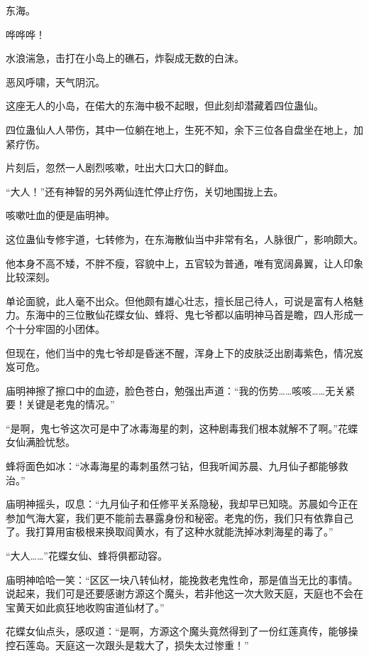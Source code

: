 
\begin{this_body}



东海。

哗哗哗！

水浪湍急，击打在小岛上的礁石，炸裂成无数的白沫。

恶风呼啸，天气阴沉。

这座无人的小岛，在偌大的东海中极不起眼，但此刻却潜藏着四位蛊仙。

四位蛊仙人人带伤，其中一位躺在地上，生死不知，余下三位各自盘坐在地上，加紧疗伤。

片刻后，忽然一人剧烈咳嗽，吐出大口大口的鲜血。

“大人！”还有神智的另外两仙连忙停止疗伤，关切地围拢上去。

咳嗽吐血的便是庙明神。

这位蛊仙专修宇道，七转修为，在东海散仙当中非常有名，人脉很广，影响颇大。

他本身不高不矮，不胖不瘦，容貌中上，五官较为普通，唯有宽阔鼻翼，让人印象比较深刻。

单论面貌，此人毫不出众。但他颇有雄心壮志，擅长屈己待人，可说是富有人格魅力。东海中的三位散仙花蝶女仙、蜂将、鬼七爷都以庙明神马首是瞻，四人形成一个十分牢固的小团体。

但现在，他们当中的鬼七爷却是昏迷不醒，浑身上下的皮肤泛出剧毒紫色，情况岌岌可危。

庙明神擦了擦口中的血迹，脸色苍白，勉强出声道：“我的伤势……咳咳……无关紧要！关键是老鬼的情况。”

“是啊，鬼七爷这次可是中了冰毒海星的刺，这种剧毒我们根本就解不了啊。”花蝶女仙满脸忧愁。

蜂将面色如冰：“冰毒海星的毒刺虽然刁钻，但我听闻苏晨、九月仙子都能够救治。”

庙明神摇头，叹息：“九月仙子和任修平关系隐秘，我却早已知晓。苏晨如今正在参加气海大宴，我们更不能前去暴露身份和秘密。老鬼的伤，我们只有依靠自己了。我打算用宙极根来换取阎黄水，有了这种水就能洗掉冰刺海星的毒了。”

“大人……”花蝶女仙、蜂将俱都动容。

庙明神哈哈一笑：“区区一块八转仙材，能挽救老鬼性命，那是值当无比的事情。说起来，我们可是还要感谢方源这个魔头，若非他这一次大败天庭，天庭也不会在宝黄天如此疯狂地收购宙道仙材了。”

花蝶女仙点头，感叹道：“是啊，方源这个魔头竟然得到了一份红莲真传，能够操控石莲岛。天庭这一次跟头是栽大了，损失太过惨重！”


\end{this_body}
